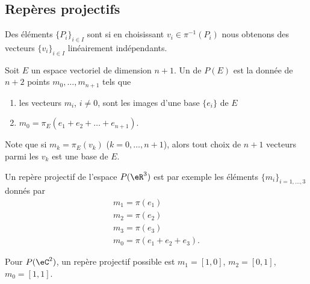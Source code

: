 \subsection{Repères projectifs}


\begin{definition}
    Des éléments \( \{ P_i \}_{i\in I}\) sont  si en choisissant \( v_i\in\pi^{-1}(P_i)\) nous obtenons des vecteurs \( \{ v_i \}_{i\in I}\) linéairement indépendants.
\end{definition}

\begin{definition}      \label{DEFooPZKFooDBXtEn}
    Soit \( E\) un espace vectoriel de dimension \( n+1\). Un  de \( P(E)\) est la donnée de \( n+2\) points \( m_0,\ldots, m_{n+1}\) tels que
    \begin{enumerate}
        \item
            les vecteurs \( m_i\), \( i\neq 0\), sont les images d'une base \( \{ e_i \}\) de \( E\)
        \item
            \( m_0=\pi_E(e_1+e_2+\ldots +e_{n+1})\).
    \end{enumerate}
\end{definition}
Note que si \( m_k=\pi_E(v_k)\) (\( k=0,\ldots, n+1\)), alors tout choix de \( n+1\) vecteurs parmi les \( v_k\) est une base de \( E\).

\begin{example}
    Un repère projectif de l'espace \( P(\eR^3)\) est par exemple les éléments \( \{ m_i \}_{i=1,\ldots, 3}\) donnés par
    \begin{subequations}
        \begin{align}
            m_1=\pi(e_1)\\
            m_2=\pi(e_2)\\
            m_3=\pi(e_3)\\
            m_0=\pi(e_1+e_2+e_3).
        \end{align}
    \end{subequations}
\end{example}

\begin{example}
    Pour \( P(\eC^2)\), un repère projectif possible est \( m_1=[1,0]\), \( m_2=[0,1]\), \( m_0=[1,1]\).
\end{example}

